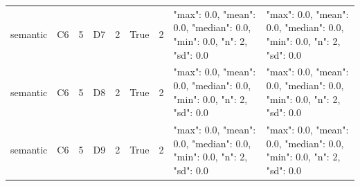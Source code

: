 \begin{tabular}{lllllllll}
semantic & C6 & 5 & D7 & 2 & True & 2 & {"max": 0.0, "mean": 0.0, "median": 0.0, "min": 0.0, "n": 2, "sd": 0.0} & {"max": 0.0, "mean": 0.0, "median": 0.0, "min": 0.0, "n": 2, "sd": 0.0} \\
semantic & C6 & 5 & D8 & 2 & True & 2 & {"max": 0.0, "mean": 0.0, "median": 0.0, "min": 0.0, "n": 2, "sd": 0.0} & {"max": 0.0, "mean": 0.0, "median": 0.0, "min": 0.0, "n": 2, "sd": 0.0} \\
semantic & C6 & 5 & D9 & 2 & True & 2 & {"max": 0.0, "mean": 0.0, "median": 0.0, "min": 0.0, "n": 2, "sd": 0.0} & {"max": 0.0, "mean": 0.0, "median": 0.0, "min": 0.0, "n": 2, "sd": 0.0} \\
\end{tabular}